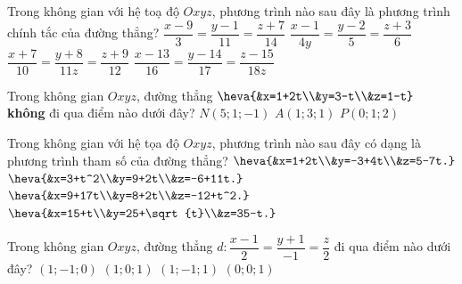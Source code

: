 \begin{ex}%
	Trong không gian với hệ toạ độ $Oxyz$, phương trình nào sau đây là  phương trình chính tắc của đường thẳng?
	\choice 
		{\True  $\dfrac{x-9}{3}=\dfrac{y-1}{11}=\dfrac{z+7}{14}$}
		{$\dfrac{x-1}{4y}=\dfrac{y-2}{5}=\dfrac{z+3}{6}$} 
		 {$\dfrac{x+7}{10}=\dfrac{y+8}{11z}=\dfrac{z+9}{12}$}
		{$\dfrac{x-13}{16}=\dfrac{y-14}{17}=\dfrac{z-15}{18z}$} 
\end{ex}

\begin{ex}%
	Trong  không gian $Oxyz$, đường thẳng $\heva{&x=1+2t\\&y=3-t\\&z=1-t}$ \textbf{không} đi qua điểm nào dưới đây?
		 {$N(5;1;-1)$}
		{$A(1;3;1)$} 
		{\True  $P(0;1;2)$}
\end{ex}

\begin{ex}%
	Trong không gian với hệ tọa độ $Oxyz$, phương trình nào sau đây có  dạng là phương trình tham số của đường thẳng?
	 \renewcommand{\dotEX}{}
	\choice 
		{\True $\heva{&x=1+2t\\&y=-3+4t\\&z=5-7t.}$} 
		 {$\heva{&x=3+t^2\\&y=9+2t\\&z=-6+11t.}$}
		{$\heva{&x=9+17t\\&y=8+2t\\&z=-12+t^2.}$} 
		{$\heva{&x=15+t\\&y=25+\sqrt{t}\\&z=35-t.}$} 
\end{ex}

\begin{ex}%
	Trong không gian $Oxyz$, đường thẳng $d\colon \dfrac{x-1}{2}=\dfrac{y+1}{-1}=\dfrac{z}{2}$ đi qua điểm  nào dưới đây?
	 \choice
		 {\True $(1;-1;0)$}
		 {$(1;0;1)$}
		{$(1;-1;1)$} 
		{$(0;0;1)$} 
\end{ex}

